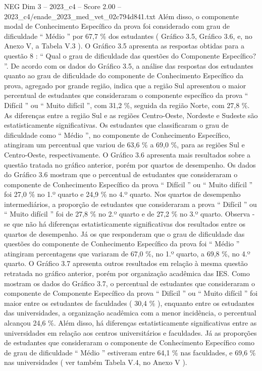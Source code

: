 \begin{textsample}{NEG Dim 3 – 2023\_c4 – Score 2.00 – 2023\_c4/enade\_2023\_med\_vet\_02c794d841.txt}
Além disso, o componente modal de Conhecimento Específico da prova foi considerado com grau de dificuldade “ Médio ” por 67,7 \% dos estudantes ( Gráfico 3.5, Gráfico 3.6, e, no Anexo V, a Tabela V.3 ).
O Gráfico 3.5 apresenta as respostas obtidas para a questão 8 : “ Qual o grau de dificuldade das questões do Componente Específico? ”.
De acordo com os dados do Gráfico 3.5, a análise das respostas dos estudantes quanto ao grau de dificuldade do componente de Conhecimento Específico da prova, agregado por grande região, indica que a região Sul apresentou o maior percentual de estudantes que consideraram o componente específico da prova “ Difícil ” ou “ Muito difícil ”, com 31,2 \%, seguida da região Norte, com 27,8 \%.
As diferenças entre a região Sul e as regiões Centro-Oeste, Nordeste e Sudeste são estatisticamente significativas.
Os estudantes que classificaram o grau de dificuldade como “ Médio ”, no componente de Conhecimento Específico, atingiram um percentual que variou de 63,6 \% a 69,0 \%, para as regiões Sul e Centro-Oeste, respectivamente.
O Gráfico 3.6 apresenta mais resultados sobre a questão tratada no gráfico anterior, porém por quartos de desempenho.
Os dados do Gráfico 3.6 mostram que o percentual de estudantes que consideraram o componente de Conhecimento Específico da prova “ Difícil ” ou “ Muito difícil ” foi 27,0 \% no 1.º quarto e 24,9 \% no 4.º quarto.
Nos quartos de desempenho intermediários, a proporção de estudantes que consideraram a prova “ Difícil ” ou “ Muito difícil ” foi de 27,8 \% no 2.º quarto e de 27,2 \% no 3.º quarto.
Observa -se que não há diferenças estatisticamente significativas dos resultados entre os quartos de desempenho.
Já os que responderam que o grau de dificuldade das questões do componente de Conhecimento Específico da prova foi “ Médio ” atingiram percentagens que variaram de 67,0 \%, no 1.º quarto, a 69,8 \%, no 4.º quarto.
O Gráfico 3.7 apresenta outros resultados em relação à mesma questão retratada no gráfico anterior, porém por organização acadêmica das IES.
Como mostram os dados do Gráfico 3.7, o percentual de estudantes que consideraram o componente de Componente Específico da prova “ Difícil ” ou “ Muito difícil ” foi maior entre os estudantes de faculdades ( 30,4 \% ), enquanto entre os estudantes das universidades, a organização acadêmica com a menor incidência, o percentual alcançou 24,6 \%.
Além disso, há diferenças estatisticamente significativas entre as universidades em relação aos centros universitários e faculdades.
Já as proporções de estudantes que consideraram o componente de Conhecimento Específico como de grau de dificuldade “ Médio ” estiveram entre 64,1 \% nas faculdades, e 69,6 \% nas universidades ( ver também Tabela V.4, no Anexo V ).

\end{textsample}
